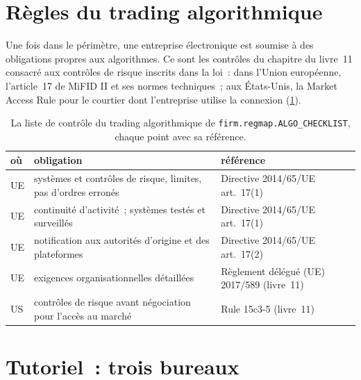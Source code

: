 \section{Règles du trading algorithmique}

Une fois dans le périmètre, une entreprise électronique est soumise à des obligations propres aux algorithmes. Ce sont les contrôles du chapitre du livre~11 consacré aux contrôles de risque
inscrits dans la loi~: dans l'Union européenne, l'article~17 de MiFID II et ses normes techniques~; aux États-Unis, la Market Access
Rule pour le courtier dont l'entreprise utilise la connexion (\cref{tab:fm:regulators-and-licences:algo}).

\begin{table}[ht]
\centering\small
\begin{tabular}{>{\raggedright\arraybackslash}p{1.2cm}>{\raggedright\arraybackslash}p{5.4cm}>{\raggedright\arraybackslash}p{6.2cm}}
\toprule
où & obligation & référence \\
\midrule
UE & systèmes et contrôles de risque, limites, pas d'ordres erronés & Directive 2014/65/UE art.~17(1) \\
UE & continuité d'activité~; systèmes testés et surveillés & Directive 2014/65/UE art.~17(1) \\
UE & notification aux autorités d'origine et des plateformes & Directive 2014/65/UE art.~17(2) \\
UE & exigences organisationnelles détaillées & Règlement délégué (UE) 2017/589 (livre~11) \\
US & contrôles de risque avant négociation pour l'accès au marché & Rule 15c3-5 (livre~11) \\
\bottomrule
\end{tabular}
\caption{La liste de contrôle du trading algorithmique de \texttt{firm.regmap.ALGO\_CHECKLIST}, chaque point avec sa référence.}\label{tab:fm:regulators-and-licences:algo}
\end{table}

\section{Tutoriel~: trois bureaux}\label{tut:fm:regulators-and-licences:tut}

